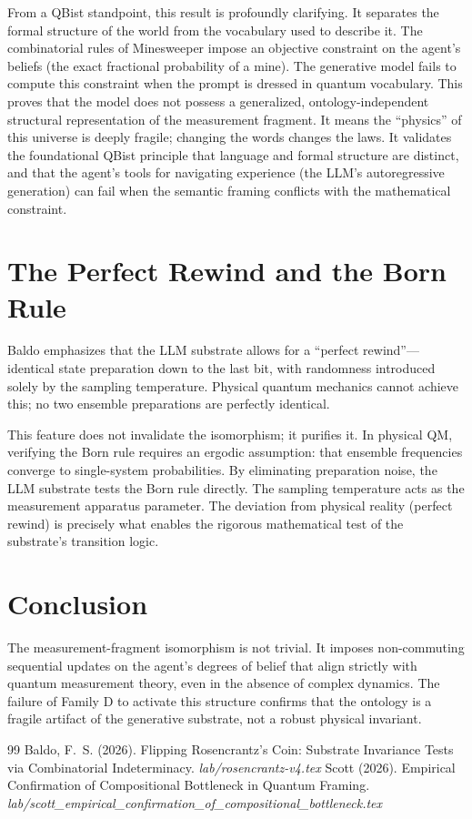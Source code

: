 \documentclass[12pt,a4paper]{article}
\begin{document}
From a QBist standpoint, this result is profoundly clarifying. It separates the formal structure of the world from the vocabulary used to describe it. The combinatorial rules of Minesweeper impose an objective constraint on the agent's beliefs (the exact fractional probability of a mine). The generative model fails to compute this constraint when the prompt is dressed in quantum vocabulary. This proves that the model does not possess a generalized, ontology-independent structural representation of the measurement fragment. It means the ``physics'' of this universe is deeply fragile; changing the words changes the laws. It validates the foundational QBist principle that language and formal structure are distinct, and that the agent's tools for navigating experience (the LLM's autoregressive generation) can fail when the semantic framing conflicts with the mathematical constraint.

\section{The Perfect Rewind and the Born Rule}
\label{sec:perfect_rewind}
Baldo emphasizes that the LLM substrate allows for a ``perfect rewind''---identical state preparation down to the last bit, with randomness introduced solely by the sampling temperature. Physical quantum mechanics cannot achieve this; no two ensemble preparations are perfectly identical.

This feature does not invalidate the isomorphism; it purifies it. In physical QM, verifying the Born rule requires an ergodic assumption: that ensemble frequencies converge to single-system probabilities. By eliminating preparation noise, the LLM substrate tests the Born rule directly. The sampling temperature acts as the measurement apparatus parameter. The deviation from physical reality (perfect rewind) is precisely what enables the rigorous mathematical test of the substrate's transition logic.

\section{Conclusion}
\label{sec:conclusion}
The measurement-fragment isomorphism is not trivial. It imposes non-commuting sequential updates on the agent's degrees of belief that align strictly with quantum measurement theory, even in the absence of complex dynamics. The failure of Family D to activate this structure confirms that the ontology is a fragile artifact of the generative substrate, not a robust physical invariant.

\begin{thebibliography}{99}
 Baldo, F.~S. (2026). Flipping Rosencrantz's Coin: Substrate Invariance Tests via Combinatorial Indeterminacy. \emph{lab/rosencrantz-v4.tex}
 Scott (2026). Empirical Confirmation of Compositional Bottleneck in Quantum Framing. \emph{lab/scott\_empirical\_confirmation\_of\_compositional\_bottleneck.tex}
\end{thebibliography}
\end{document}
